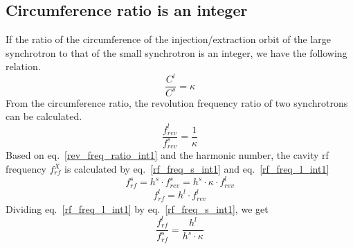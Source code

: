 %
 


\subsection{Circumference ratio is an integer}
\label{sec:cir_integer}
If the ratio of the circumference of the injection/extraction orbit of the large synchrotron to that of the small synchrotron is an integer, we have the following relation. 
\begin{equation}
\frac{C^l}{C^s}=\kappa \label{circumference_ratio_int1}
\end{equation}
From the circumference ratio, the revolution frequency ratio of two synchrotrons can be calculated.
\begin{equation}
\frac{f_{\mathit{rev}}^{l}}{f_{\mathit{rev}}^{s}}=\frac{1}{\kappa} \label{rev_freq_ratio_int1}
\end{equation}
Based on eq.~\ref{rev_freq_ratio_int1} and the harmonic number, the cavity rf frequency $f_{rf}^{X}$ is calculated by eq.~\ref{rf_freq_s_int1} and eq.~\ref{rf_freq_l_int1}
\begin{equation} 
f_{\mathit{rf}}^{s}= h^s \cdot f_{\mathit{rev}}^{s}=h^s \cdot \kappa \cdot f_{rev}^{l} \label{rf_freq_s_int1}
\end{equation}
\begin{equation} 
f_{\mathit{rf}}^{l}= h^l \cdot f_{\mathit{rev}}^{l} \label{rf_freq_l_int1}
\end{equation}
Dividing eq.~\ref{rf_freq_l_int1} by eq.~\ref{rf_freq_s_int1}, we get
\begin{equation} 
\frac{f_{\mathit{rf}}^{l}}{f_{\mathit{rf}}^{s}}= \frac{h^l}{h^s \cdot \kappa} \label{rf_freq_ratio1}
\end{equation}

